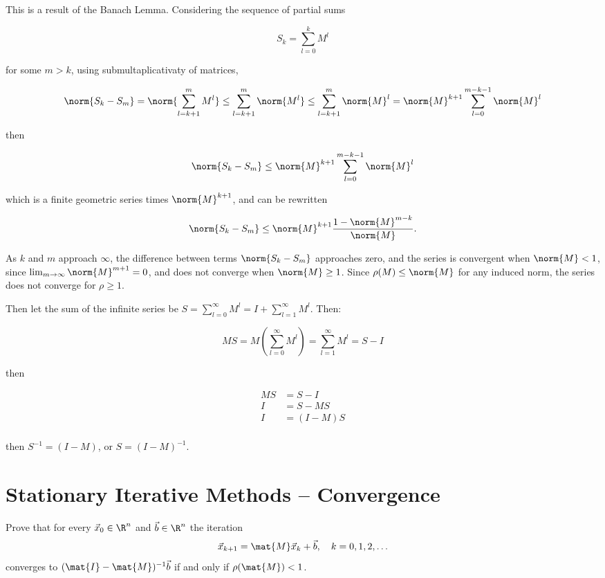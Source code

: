 \documentclass{template}
\begin{document}
This is a result of the Banach Lemma. Considering the sequence of partial sums

\begin{equation}
  S_k = \sum_{l=0}^{k}M^l
\end{equation}

for some $m>k$, using submultaplicativaty of matrices,

\begin{equation}
  \norm{S_k - S_m} = \norm{\sum_{l=k+1}^{m}M^l} \leq \sum_{l=k+1}^{m}\norm{M^l} \leq \sum_{l=k+1}^{m}\norm{M}^l = \norm{M}^{k+1}\sum_{l=0}^{m-k-1}\norm{M}^l
\end{equation}

then

\begin{equation}
  \norm{S_k - S_m}  \leq \norm{M}^{k+1}\sum_{l=0}^{m-k-1}\norm{M}^l
\end{equation}

which is a finite geometric series times $\norm{M}^{k+1}$, and can be rewritten

\begin{equation}
  \norm{S_k - S_m} \leq \norm{M}^{k+1} \frac{1 - \norm{M}^{m-k}}{\norm{M}}.
\end{equation}

As $k$ and $m$ approach $\infty$, the difference between terms $\norm{S_k - S_m}$ approaches zero, and the series is convergent when $\norm{M}<1$, since $\lim_{m\rightarrow\infty}\norm{M}^{m+1} = 0$, and does not converge when $\norm{M}\geq 1$. Since $\rho(M)\leq \norm{M}$ for any induced norm, the series does not converge for $\rho \geq 1$.

Then let the sum of the infinite series be $S = \sum_{l=0}^{\infty}M^l = I+\sum_{l=1}^{\infty}M^l$. Then:

\begin{equation}
  MS = M\left( \sum_{l=0}^{\infty}M^l\right) = \sum_{l=1}^{\infty}M^l = S - I
\end{equation}

then

\begin{align}
  MS &= S - I\\
  I &= S - MS\\
  I &= (I-M)S\\
\end{align}

then $S^{-1} =(I-M) $, or $S =(I-M)^{-1}$. 


\section{Stationary Iterative Methods -- Convergence}
Prove that for every $\vec{x}_0 \in \R^n$ and $\vec{b} \in \R^n$ the iteration 
\[
   \vec{x}_{k+1} = \mat{M}\vec{x}_k + \vec{b}, \quad k = 0, 1, 2, \ldots 
\]
converges to $(\mat{I}-\mat{M})^{-1}\vec{b}$ if and only if $\rho(\mat{M}) < 1$.
\end{document}
